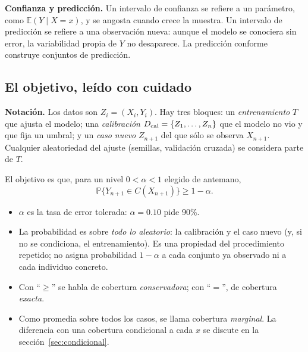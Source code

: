 \documentclass[11pt]{article}
\theoremstyle{plain}
\theoremstyle{definition}
\theoremstyle{remark}
\newcommand{\Prob}{\mathbb P}
\newcommand{\E}{\mathbb E}
\newcommand{\dest}[1]{\par\needspace{4\baselineskip}\textbf{#1}\quad}
\begin{document}
\dest{Confianza y predicción.} Un intervalo de confianza se refiere a un parámetro, como
$\E(Y\mid X=x)$, y se angosta cuando crece la muestra. Un intervalo de predicción se refiere a una
observación nueva: aunque el modelo se conociera sin error, la variabilidad propia de $Y$ no
desaparece. La predicción conforme construye conjuntos de predicción.

\subsection{El objetivo, leído con cuidado}
\dest{Notación.} Los datos son $Z_i=(X_i,Y_i)$. Hay tres bloques: un \emph{entrenamiento} $T$ que
ajusta el modelo; una \emph{calibración} $D_{\rm cal}=\{Z_1,\dots,Z_n\}$ que el modelo no vio y que
fija un umbral; y un \emph{caso nuevo} $Z_{n+1}$ del que sólo se observa $X_{n+1}$. Cualquier
aleatoriedad del ajuste (semillas, validación cruzada) se considera parte de $T$.

El objetivo es que, para un nivel $0<\alpha<1$ elegido de antemano,
\[
 \Prob\{Y_{n+1}\in C(X_{n+1})\}\ge 1-\alpha .
\]
\begin{itemize}
\item $\alpha$ es la tasa de error tolerada: $\alpha=0.10$ pide 90\%.
\item La probabilidad es sobre \emph{todo lo aleatorio}: la calibración y el caso nuevo (y, si no se
condiciona, el entrenamiento). Es una propiedad del procedimiento repetido; no asigna probabilidad
$1-\alpha$ a cada conjunto ya observado ni a cada individuo concreto.
\item Con ``$\ge$'' se habla de cobertura \emph{conservadora}; con ``$=$'', de cobertura
\emph{exacta}.
\item Como promedia sobre todos los casos, se llama cobertura \emph{marginal}. La diferencia con una
cobertura condicional a cada $x$ se discute en la sección~\ref{sec:condicional}.
\end{itemize}
\end{document}
